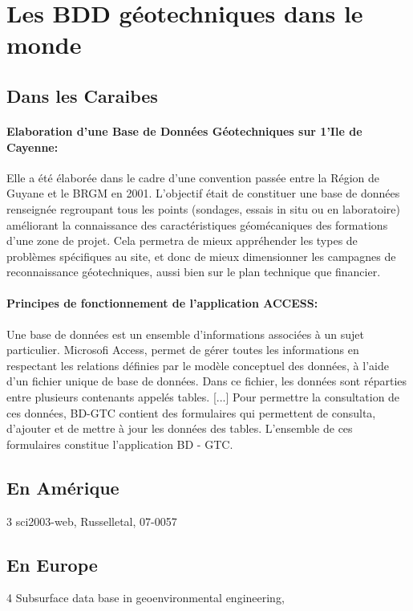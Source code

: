         \section{Les BDD géotechniques dans le monde}
        \subsection{Dans les Caraibes}
        \paragraph{Elaboration d'une Base de Données Géotechniques
        sur 1'Ile de Cayenne: }
        Elle a été élaborée dans le cadre d'une convention passée entre la
        Région de Guyane et le BRGM en 2001.
        \cite{Cayenne}
         L'objectif était de constituer une base de données renseignée regroupant tous les points (sondages, essais
        in situ ou en laboratoire) améliorant la connaissance des caractéristiques géomécaniques des
        formations d'une zone de projet. Cela permetra de mieux appréhender les types de problèmes
        spécifiques au site, et donc de mieux dimensionner les campagnes de reconnaissance
        géotechniques, aussi bien sur le plan technique que financier.
       \paragraph{ Principes de fonctionnement de l'application ACCESS: }
       Une base de données est un ensemble d'informations associées à un sujet particulier.
        Microsofi Access, permet de gérer toutes les informations en respectant les relations définies
        par le modèle conceptuel des données, à l'aide d'un fichier unique de base de données. Dans
        ce fichier, les données sont réparties entre plusieurs contenants appelés tables. [...]
        Pour permettre la consultation de ces données, BD-GTC contient des formulaires qui
        permettent de consulta, d'ajouter et de mettre à jour les données des tables. L'ensemble de ces
        formulaires constitue l'application BD - GTC.
        \cite{Cayenne}

        \subsection{En Amérique}
        3 sci2003-web,
        Russelletal,
        07-0057
        \subsection{En Europe}
        4 Subsurface data base in geoenvironmental engineering,

